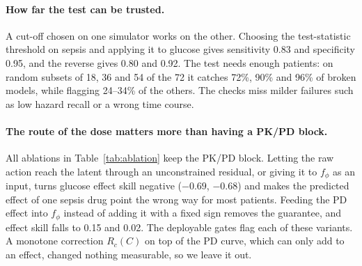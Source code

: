 \documentclass[letterpaper]{article}
\begin{document}
\paragraph{How far the test can be trusted.} A cut-off chosen on one simulator works on the other. Choosing the test-statistic threshold on sepsis and applying it to glucose gives sensitivity 0.83 and specificity 0.95, and the reverse gives 0.80 and 0.92. The test needs enough patients: on random subsets of 18, 36 and 54 of the 72 it catches 72\%, 90\% and 96\% of broken models, while flagging 24--34\% of the others. The checks miss milder failures such as low hazard recall or a wrong time course.

\begin{table}[t]
\centering
\resizebox{\columnwidth}{!}{}
\caption{Ablations at $\lambda=0.75$, each changing one design choice. Our model is in bold. Skill: effect skill. Dir.: worst share of patients with the right effect direction. Gap: error on randomised patients divided by error on the model's own policy (pass mark: 1.25).}
\label{tab:ablation}
\end{table}

\paragraph{The route of the dose matters more than having a PK/PD block.} All ablations in Table~\ref{tab:ablation} keep the PK/PD block. Letting the raw action reach the latent through an unconstrained residual, or giving it to $f_\phi$ as an input, turns glucose effect skill negative ($-0.69$, $-0.68$) and makes the predicted effect of one sepsis drug point the wrong way for most patients. Feeding the PD effect into $f_\phi$ instead of adding it with a fixed sign removes the guarantee, and effect skill falls to 0.15 and 0.02. The deployable gates flag each of these variants. A monotone correction $R_c(C)$ on top of the PD curve, which can only add to an effect, changed nothing measurable, so we leave it out.
\end{document}
